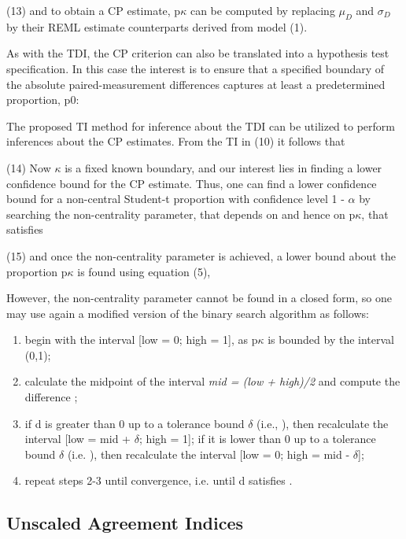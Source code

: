 \documentclass[MAIN.tex]{subfiles}
\begin{document}
	(13)
	and to obtain a CP estimate, p$\kappa$ can be computed by replacing $\mu_D$ and $\sigma_D$ by their REML estimate counterparts derived from model (1).
	
	As with the TDI, the CP criterion can also be translated into a hypothesis test specification. 
	In this case the interest is to ensure that a specified boundary of the absolute paired-measurement differences captures at least a predetermined proportion, p0:
	
	
	The proposed TI method for inference about the TDI can be utilized to perform inferences about the CP estimates. From the TI in (10) it follows that
	
	(14)
	Now $\kappa$ is a fixed known boundary, and our interest lies in finding a lower confidence bound for the CP estimate. 
	Thus, one can find a lower confidence bound for a non-central Student-t proportion with confidence level 1 - $\alpha$ by searching the non-centrality parameter, 
	that depends on  and hence on p$\kappa$, that satisfies
	
	(15)
	and once the non-centrality parameter  is achieved, a lower bound about the proportion p$\kappa$ is found using equation (5), 
	
	
	However, the non-centrality parameter cannot be found in a closed form, so one may use again a modified version of the binary search algorithm as follows:
	
\begin{enumerate}
		\item begin with the interval [low = 0; high = 1], as p$\kappa$ is bounded by the interval (0,1);
		
		\item calculate the midpoint of the interval \textit{mid = (low + high)/2} and compute the difference ;
		
		\item if d is greater than 0 up to a tolerance bound $\delta$ (i.e., ), then recalculate the interval [low = mid + $\delta$; high = 1]; if it is 
		lower than 0 up to a tolerance bound $\delta$ (i.e. ), then recalculate the interval [low = 0; high = mid - $\delta$];
		
		\item repeat steps 2-3 until convergence, i.e. until d satisfies .
\end{enumerate}
\subsection*{Unscaled Agreement Indices}
\end{document}
